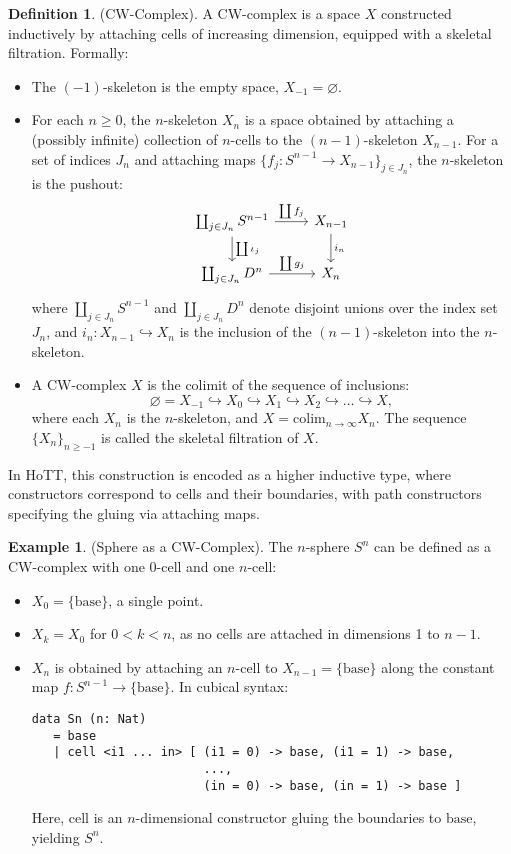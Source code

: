 \documentclass{article}
\theoremstyle{definition}
\newtheorem{definition}{Definition}
\newtheorem{example}{Example}
\newcommand*{\incmap}{\hookrightarrow}
\begin{document}
\begin{definition} (CW-Complex). A CW-complex is a space \( X \) constructed inductively by attaching cells of increasing dimension, equipped with a skeletal filtration. Formally:
\begin{itemize}
    \item The \((-1)\)-skeleton is the empty space, \( X_{-1} = \varnothing \).
    \item For each \( n \geq 0 \), the \( n \)-skeleton \( X_n \) is a space obtained by attaching a (possibly infinite) collection of \( n \)-cells to the \((n-1)\)-skeleton \( X_{n-1} \). For a set of indices \( J_n \) and attaching maps \( \{ f_j : S^{n-1} \to X_{n-1} \}_{j \in J_n} \), the \( n \)-skeleton is the pushout:
    \[
    \begin{tikzcd}
    \coprod_{j \in J_n} S^{n-1} \arrow[r, "\coprod f_j"] \arrow[d, "\coprod \iota_j"] & X_{n-1} \arrow[d, "i_n"] \\
    \coprod_{j \in J_n} D^n \arrow[r, "\coprod g_j"] & X_n
    \end{tikzcd}
    \]
    where \( \coprod_{j \in J_n} S^{n-1} \) and \( \coprod_{j \in J_n} D^n \) denote disjoint unions over the index set \( J_n \), and \( i_n : X_{n-1} \incmap X_n \) is the inclusion of the \((n-1)\)-skeleton into the \( n \)-skeleton.
    \item A CW-complex \( X \) is the colimit of the sequence of inclusions:
    \[
    \varnothing = X_{-1} \incmap X_0 \incmap X_1 \incmap X_2 \incmap \dots \incmap X,
    \]
    where each \( X_n \) is the \( n \)-skeleton, and \( X = \text{colim}_{n \to \infty} X_n \). The sequence \( \{ X_n \}_{n \geq -1} \) is called the skeletal filtration of \( X \).
\end{itemize}
In HoTT, this construction is encoded as a higher inductive type, where constructors correspond to cells and their boundaries, with path constructors specifying the gluing via attaching maps.
\end{definition}

\begin{example} (Sphere as a CW-Complex). The \( n \)-sphere \( S^n \) can be defined as a CW-complex with one 0-cell and one \( n \)-cell:
\begin{itemize}
    \item \( X_0 = \{ \text{base} \} \), a single point.
    \item \( X_k = X_0 \) for \( 0 < k < n \), as no cells are attached in dimensions 1 to \( n-1 \).
    \item \( X_n \) is obtained by attaching an \( n \)-cell to \( X_{n-1} = \{ \text{base} \} \) along the constant map \( f : S^{n-1} \to \{ \text{base} \} \). In cubical syntax:
    \begin{lstlisting}
data Sn (n: Nat)
   = base
   | cell <i1 ... in> [ (i1 = 0) -> base, (i1 = 1) -> base,
                        ...,
                        (in = 0) -> base, (in = 1) -> base ]
    \end{lstlisting}
    Here, \( \text{cell} \) is an \( n \)-dimensional constructor gluing the boundaries to \( \text{base} \), yielding \( S^n \).
\end{itemize}
\end{example}
\end{document}
